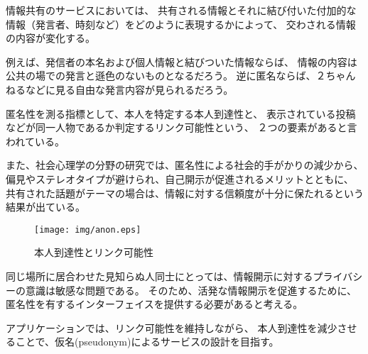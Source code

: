情報共有のサービスにおいては、
共有される情報とそれに結び付いた付加的な情報（発言者、時刻など）をどのように表現するかによって、
交わされる情報の内容が変化する。

例えば、発信者の本名および個人情報と結びついた情報ならば、
情報の内容は公共の場での発言と遜色のないものとなるだろう。
逆に匿名ならば、２ちゃんねる\cite{2ch}などに見る自由な発言内容が見られるだろう。

匿名性を測る指標として、本人を特定する本人到達性と、
表示されている投稿などが同一人物であるか判定するリンク可能性という、
２つの要素があると言われている。\cite{anon_terminology}

また、社会心理学の分野の研究\cite{diet}では、匿名性による社会的手がかりの減少から、
偏見やステレオタイプが避けられ、自己開示が促進されるメリットとともに、
共有された話題がテーマの場合は、情報に対する信頼度が十分に保たれるという結果が出ている。

\begin{figure}[h]
    \begin{center}
        \texttt{[image: img/anon.eps]}
    \end{center}
    \caption{本人到達性とリンク可能性}
    \label{fig:anon}
\end{figure}

同じ場所に居合わせた見知らぬ人同士にとっては、情報開示に対するプライバシーの意識は敏感な問題である。
そのため、活発な情報開示を促進するために、匿名性を有するインターフェイスを提供する必要があると考える。

アプリケーションでは、リンク可能性を維持しながら、
本人到達性を減少させることで、仮名(pseudonym)によるサービスの設計を目指す。
